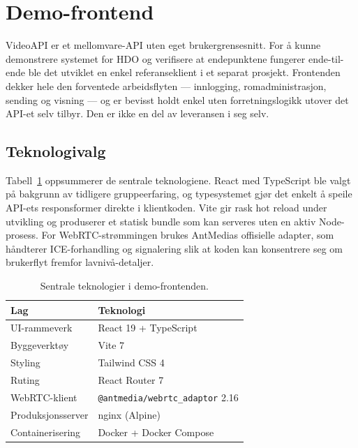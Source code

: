 \section{Demo-frontend}
\label{sec:demo-frontend}

VideoAPI er et mellomvare-API uten eget brukergrensesnitt. For å kunne
demonstrere systemet for HDO og verifisere at endepunktene fungerer
ende-til-ende ble det utviklet en enkel referanseklient i et separat prosjekt.
Frontenden dekker hele den forventede arbeidsflyten --- innlogging,
romadministrasjon, sending og visning --- og er bevisst holdt enkel uten
forretningslogikk utover det API-et selv tilbyr. Den er ikke en del av
leveransen i seg selv.

\subsection{Teknologivalg}
\label{subsec:demo-tech}

Tabell~\ref{tab:frontend-tech} oppsummerer de sentrale teknologiene.
React med TypeScript ble valgt på bakgrunn av tidligere gruppeerfaring, og
typesystemet gjør det enkelt å speile API-ets responsformer direkte i
klientkoden. Vite gir rask hot reload under utvikling og produserer et statisk
bundle som kan serveres uten en aktiv Node-prosess. For WebRTC-strømmingen
brukes AntMedias offisielle adapter, som håndterer ICE-forhandling og
signalering slik at koden kan konsentrere seg om brukerflyt fremfor
lavnivå-detaljer.

\begin{table}[h]
\centering
\caption{Sentrale teknologier i demo-frontenden.}
\label{tab:frontend-tech}
\begin{tabular}{l l}
\toprule
\textbf{Lag} & \textbf{Teknologi} \\
\midrule
UI-rammeverk        & React 19 + TypeScript \\
Byggeverktøy        & Vite 7 \\
Styling             & Tailwind CSS 4 \\
Ruting              & React Router 7 \\
WebRTC-klient       & \texttt{@antmedia/webrtc\_adaptor} 2.16 \\
Produksjonsserver   & nginx (Alpine) \\
Containerisering    & Docker + Docker Compose \\
\bottomrule
\end{tabular}
\end{table}
\newpage

